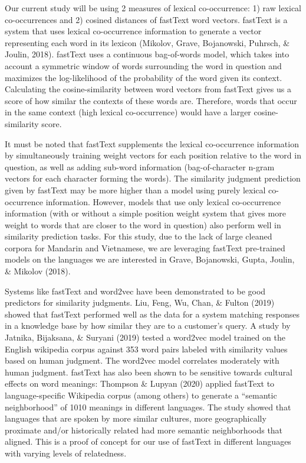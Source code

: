 \documentclass[10pt, letterpaper]{article}
\begin{document}
Our current study will be using 2 measures of lexical co-occurrence: 1)
raw lexical co-occurrences and 2) cosined distances of fastText word
vectors. fastText is a system that uses lexical co-occurrence
information to generate a vector representing each word in its lexicon
(Mikolov, Grave, Bojanowski, Puhrsch, \& Joulin, 2018). fastText uses a
continuous bag-of-words model, which takes into account a symmetric
window of words surrounding the word in question and maximizes the
log-likelihood of the probability of the word given its context.
Calculating the cosine-similarity between word vectors from fastText
gives us a score of how similar the contexts of these words are.
Therefore, words that occur in the same context (high lexical
co-occurrence) would have a larger cosine-similarity score.

It must be noted that fastText supplements the lexical co-occurrence
information by simultaneously training weight vectors for each position
relative to the word in question, as well as adding sub-word information
(bag-of-character n-gram vectors for each character forming the words).
The similarity judgment prediction given by fastText may be more higher
than a model using purely lexical co-occurrence information. However,
models that use only lexical co-occurrence information (with or without
a simple position weight system that gives more weight to words that are
closer to the word in question) also perform well in similarity
prediction tasks. For this study, due to the lack of large cleaned
corpora for Mandarin and Vietnamese, we are leveraging fastText
pre-trained models on the languages we are interested in Grave,
Bojanowski, Gupta, Joulin, \& Mikolov (2018).

Systems like fastText and word2vec have been demonstrated to be good
predictors for similarity judgments. Liu, Feng, Wu, Chan, \& Fulton
(2019) showed that fastText performed well as the data for a system
matching responses in a knowledge base by how similar they are to a
customer's query. A study by Jatnika, Bijaksana, \& Suryani (2019)
tested a word2vec model trained on the English wikipedia corpus against
353 word pairs labeled with similarity values based on human judgment.
The word2vec model correlates moderately with human judgment. fastText
has also been shown to be sensitive towards cultural effects on word
meanings: Thompson \& Lupyan (2020) applied fastText to
language-specific Wikipedia corpus (among others) to generate a
``semantic neighborhood'' of 1010 meanings in different languages. The
study showed that languages that are spoken by more similar cultures,
more geographically proximate and/or historically related had more
semantic neighborhoods that aligned. This is a proof of concept for our
use of fastText in different languages with varying levels of
relatedness.
\end{document}
